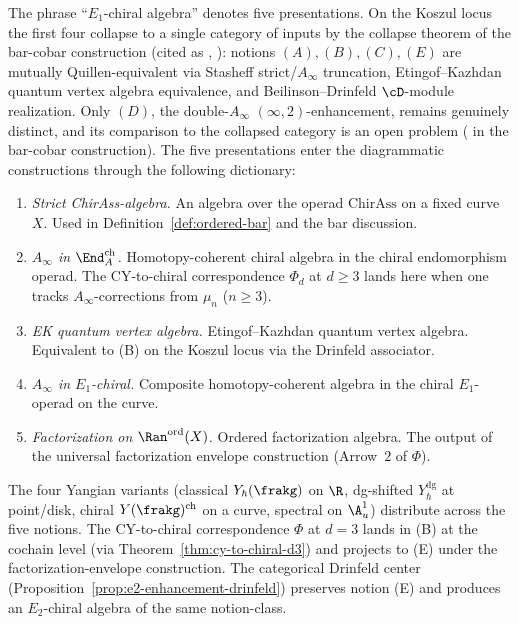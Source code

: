\begin{remark}
\label{rem:five-e1-chiral-notions}
The phrase ``$E_1$-chiral algebra'' denotes
five presentations. On the Koszul locus the first four collapse to a single
category of inputs by the collapse theorem of the bar-cobar construction (cited as
\cite{VolII}, \cite[Part~I, Foundations]{VolI}):
notions $(A), (B), (C), (E)$ are mutually Quillen-equivalent via
Stasheff strict/$A_\infty$ truncation, Etingof--Kazhdan quantum vertex
algebra equivalence, and Beilinson--Drinfeld $\cD$-module realization.
Only $(D)$, the double-$A_\infty$ $(\infty,2)$-enhancement, remains
genuinely distinct, and its comparison to the collapsed category is
an open problem
(\cite{VolI} in the bar-cobar construction). The five
presentations enter the diagrammatic constructions through the following
dictionary:
\begin{enumerate}[label=\textup{(\Alph*)}]
 \item \emph{Strict ChirAss-algebra.} An algebra over the operad
 $\mathrm{ChirAss}$ on a fixed curve $X$. Used in
 Definition~\ref{def:ordered-bar} and the bar discussion.
 \item \emph{$A_\infty$ in $\End^{\mathrm{ch}}_A$.} Homotopy-coherent
 chiral algebra in the chiral endomorphism operad. The CY-to-chiral
 correspondence $\Phi_d$ at $d \geq 3$ lands here when one tracks
 $A_\infty$-corrections from $\mu_n$ \textup{($n \geq 3$)}.
 \item \emph{EK quantum vertex algebra.} Etingof--Kazhdan quantum
 vertex algebra. Equivalent to (B) on the Koszul locus via the Drinfeld associator.
 \item \emph{$A_\infty$ in $E_1$-chiral.} Composite homotopy-coherent
 algebra in the chiral $E_1$-operad on the curve.
 \item \emph{Factorization on $\Ran^{\mathrm{ord}}(X)$.} Ordered
 factorization algebra. The output of the
 universal factorization envelope construction
 \textup{(}Arrow~$2$ of $\Phi$\textup{)}.
\end{enumerate}
The four Yangian variants \textup{(}classical $Y_\hbar(\frakg)$
on $\R$, dg-shifted $Y^{\mathrm{dg}}_\hbar$ at point/disk, chiral
$Y(\frakg)^{\mathrm{ch}}$ on a curve, spectral on $\A^1_u$\textup{)}
distribute across the five notions. The CY-to-chiral correspondence $\Phi$ at $d = 3$
lands in (B) at the cochain level
\textup{(}via Theorem~\ref{thm:cy-to-chiral-d3}\textup{)} and
projects to (E) under the factorization-envelope construction.
The categorical Drinfeld center
\textup{(}Proposition~\ref{prop:e2-enhancement-drinfeld}\textup{)}
preserves notion (E) and produces an $E_2$-chiral algebra of the
same notion-class.
\end{remark}

